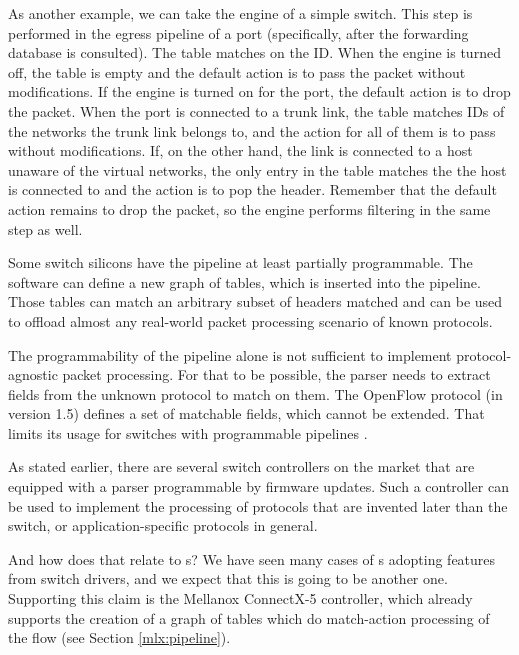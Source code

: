As another example, we can take the  engine of a simple switch. This step
is performed in the egress pipeline of a port (specifically, after the forwarding database
is consulted). The table matches on the  ID. When the engine is turned
off, the table is empty and the default action is to pass the packet without
modifications. If the engine is turned on for the port, the default action is
to drop the packet. When the port is connected to a trunk link, the table matches
 IDs of the networks the trunk link belongs to, and the action for
all of them is to pass without modifications. If, on the other hand, the link is
connected to a host unaware of the virtual networks, the only entry in the table
matches the  the host is connected to and the action is to pop the 
header. Remember that the default action remains to drop the packet, so the
engine performs filtering in the same step as well.

Some switch silicons have the pipeline at least partially programmable.
The software can define a new graph of tables, which is inserted into the
pipeline. Those tables can match an arbitrary subset of headers matched and can be
used to offload almost any real-world packet processing scenario of known
protocols.

The programmability of the pipeline alone is not sufficient to implement
protocol-agnostic packet processing. For that to be possible, the parser needs
to extract fields from the unknown protocol to match on them. The OpenFlow
protocol (in version 1.5) defines a set of matchable fields, which
cannot be extended. That limits its usage for switches with programmable
pipelines \cite{openflow}.

As stated earlier, there are several switch controllers on the market that are
equipped with a parser programmable by firmware updates. Such a controller can be
used to implement the processing of protocols that are invented later than the
switch, or application-specific protocols in general.

And how does that relate to s? We have seen many cases of s adopting
features from switch drivers, and we expect that this is going to be another
one. Supporting this claim is the Mellanox ConnectX-5 controller, which already
supports the creation of a graph of tables which do match-action processing of
the flow (see Section \ref{mlx:pipeline}).



